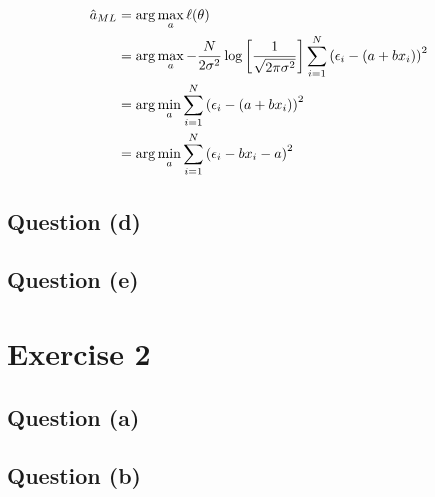 \documentclass[12pt]{article}
\begin{document}
\begin{align*}
    \hat a_{ML}
     & =\arg \max_a \ell(\theta)                                                                                                                    \\
     & = \arg \max_a -\frac{N}{2 \sigma^2}\log \left[\frac{1}{\sqrt{2 \pi \sigma^{2}}}\right] \sum_{i=1}^N \left(\epsilon_i - (a + bx_i)\right)^{2} \\
     & = \arg \min_a  \sum_{i=1}^N \left(\epsilon_i - (a + bx_i)\right)^{2}                                                                         \\
     & = \arg \min_a  \sum_{i=1}^N \left(\epsilon_i - bx_i - a\right)^{2}                                                                           \\
\end{align*}


\subsection{Question (d)}
\subsection{Question (e)}
\section{Exercise 2}
\subsection{Question (a)}
\subsection{Question (b)}

\clearpage

\end{document}
